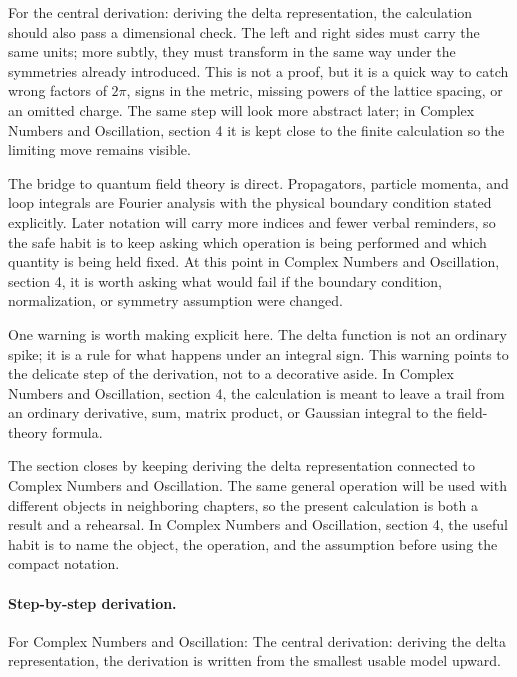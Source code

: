 For the central derivation: deriving the delta representation, the calculation should also pass a dimensional check.  The left and right sides must carry the same units; more subtly, they must transform in the same way under the symmetries already introduced.  This is not a proof, but it is a quick way to catch wrong factors of \(2\pi\), signs in the metric, missing powers of the lattice spacing, or an omitted charge.  The same step will look more abstract later; in Complex Numbers and Oscillation, section 4 it is kept close to the finite calculation so the limiting move remains visible.

The bridge to quantum field theory is direct.  Propagators, particle momenta, and loop integrals are Fourier analysis with the physical boundary condition stated explicitly.  Later notation will carry more indices and fewer verbal reminders, so the safe habit is to keep asking which operation is being performed and which quantity is being held fixed.  At this point in Complex Numbers and Oscillation, section 4, it is worth asking what would fail if the boundary condition, normalization, or symmetry assumption were changed.

One warning is worth making explicit here.  The delta function is not an ordinary spike; it is a rule for what happens under an integral sign.  This warning points to the delicate step of the derivation, not to a decorative aside.  In Complex Numbers and Oscillation, section 4, the calculation is meant to leave a trail from an ordinary derivative, sum, matrix product, or Gaussian integral to the field-theory formula.

The section closes by keeping deriving the delta representation connected to Complex Numbers and Oscillation.  The same general operation will be used with different objects in neighboring chapters, so the present calculation is both a result and a rehearsal.  In Complex Numbers and Oscillation, section 4, the useful habit is to name the object, the operation, and the assumption before using the compact notation.



\paragraph{Step-by-step derivation.}

For Complex Numbers and Oscillation: The central derivation: deriving the delta representation, the derivation is written from the smallest usable model upward.

